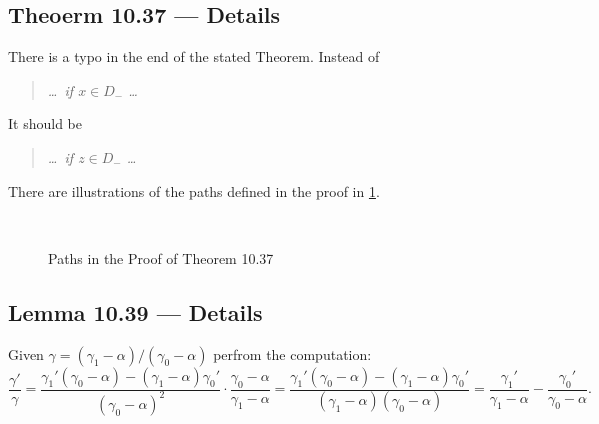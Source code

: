 \subsection{Theoerm 10.37 --- Details}

There is a typo in the end of the stated Theorem.
Instead of
\begin{quote}
\textsl{\ldots\ if \(x\in D_-\) \ldots}
\end{quote}
It should be
\begin{quote}
\textsl{\ldots\ if \(z\in D_-\) \ldots}
\end{quote}

There are illustrations of the paths defined in the proof 
in \figurename{\ref{fig:10-37}}.
\begin{figure}[ht]
%
%
\hspace{0.1\textwidth}
%
%
\\[20pt]%
%
%
\hspace{0.1\textwidth}
%
%
\caption{Paths in the Proof of Theorem 10.37}
\label{fig:10-37}
\end{figure}


\subsection{Lemma 10.39 --- Details}

Given \(\gamma = (\gamma_1 - \alpha) / (\gamma_0 - \alpha)\)
perfrom the computation:
\begin{equation*}
\frac{\gamma'}{\gamma}
= \frac{\gamma_1'(\gamma_0-\alpha) - (\gamma_1-\alpha)\gamma_0'}{
               (\gamma_0 - \alpha)^2}
   \cdot \frac{\gamma_0 - \alpha}{\gamma_1 - \alpha}
= \frac{\gamma_1'(\gamma_0-\alpha) - (\gamma_1-\alpha)\gamma_0'}{
               (\gamma_1 - \alpha)(\gamma_0 - \alpha)}
= \frac{\gamma_1'}{\gamma_1-\alpha} - \frac{\gamma_0'}{\gamma_0-\alpha}.
\end{equation*}

